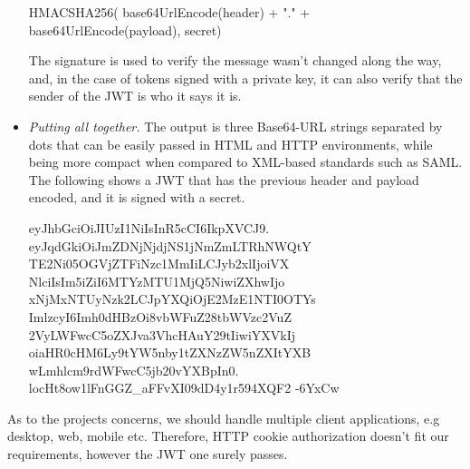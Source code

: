 \begin{itemize}
    \begin{spverbatim}
        HMACSHA256(
        base64UrlEncode(header) + "." +
        base64UrlEncode(payload),
        secret)
    \end{spverbatim}

    The signature is used to verify the message wasn't changed along the way, and, in the case of tokens signed
    with a private key, it can also verify that the sender of the JWT is who it says it is.
    \item \textit{Putting all together.} The output is three Base64-URL strings separated by dots that can be easily
    passed in HTML and HTTP environments, while being more compact when compared to XML-based standards such as SAML\@.
    The following shows a JWT that has the previous header and payload encoded, and it is signed with a secret.

    \begin{spverbatim}
        eyJhbGciOiJIUzI1NiIsInR5cCI6IkpXVCJ9.
        eyJqdGkiOiJmZDNjNjdjNS1jNmZmLTRhNWQtY
        TE2Ni05OGVjZTFiNzc1MmIiLCJyb2xlIjoiVX
        NlciIsIm5iZiI6MTYzMTU1MjQ5NiwiZXhwIjo
        xNjMxNTUyNzk2LCJpYXQiOjE2MzE1NTI0OTYs
        ImlzcyI6Imh0dHBzOi8vbWFuZ28tbWVzc2VuZ
        2VyLWFwcC5oZXJva3VhcHAuY29tIiwiYXVkIj
        oiaHR0cHM6Ly9tYW5nby1tZXNzZW5nZXItYXB
        wLmhlcm9rdWFwcC5jb20vYXBpIn0.
        locHt8ow1lFnGGZ_aFFvXI09dD4y1r594XQF2
        -6YxCw
    \end{spverbatim}

\end{itemize}

As to the projects concerns, we should handle multiple client applications, e.g desktop,
web, mobile etc.
Therefore, HTTP cookie authorization doesn't fit our requirements, however the JWT one surely passes.

